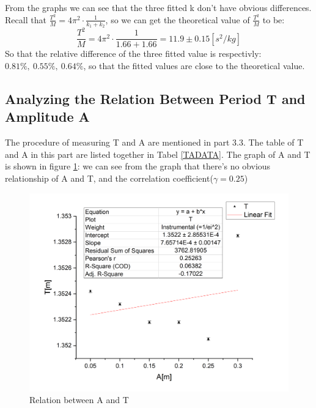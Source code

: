\documentclass[11pt,a4paper]{article}
\begin{document}
\qquad From the graphs we can see that the three fitted k don't have obvious differences. Recall that $\frac{T^2}{M}=4\pi^2\cdot \frac{1}{k_1+k_2}$, so we can get the theoretical value of $\frac{T^2}{M}$ to be:$$\frac{T^2}{M}=4\pi^2\cdot \frac{1}{1.66+1.66}=11.9\pm 0.15[s^2/kg]$$
So that the relative difference of the three fitted value is respectivly: $0.81\%,\ 0.55\%,\ 0.64\%$, so that the fitted values are close to the theoretical value.
\subsection{Analyzing the Relation Between Period T and Amplitude A}
\qquad The procedure of measuring T and A are mentioned in part 3.3. The table of T and A in this part are listed together in Tabel \ref{TADATA}. The graph of A and T is shown in figure \ref{figureAT}: we can see from the graph that there's no obvious relationship of A and T, and the correlation coefficient($\gamma=0.25$)
\begin{figure}[H]
    \centering
    \includegraphics[scale=0.4]{TvsA.png}
    \caption{Relation between A and T}
    \label{figureAT}
\end{figure}
\end{document}

